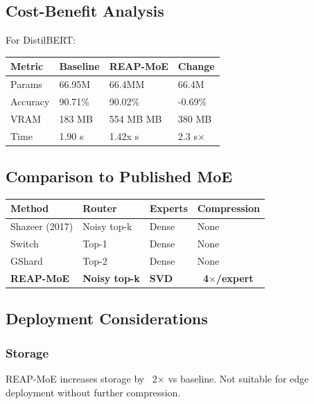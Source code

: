 \subsection{Cost-Benefit Analysis}

For DistilBERT:

\begin{table}[H]
\centering
\small
\begin{tabular}{llll}
\toprule
\textbf{Metric} & \textbf{Baseline} & \textbf{REAP-MoE} & \textbf{Change} \\
\midrule
Params & 66.95M & 66.4MM & 66.4M \\
Accuracy & 90.71\% & 90.02\% & -0.69\% \\
VRAM & 183 MB & 554 MB MB & 380 MB \\
Time & 1.90 s & 1.42x s & 2.3 s$\times$ \\
\bottomrule
\end{tabular}
\end{table}

\subsection{Comparison to Published MoE}

\begin{table}[H]
\centering
\small
\begin{tabular}{llll}
\toprule
\textbf{Method} & \textbf{Router} & \textbf{Experts} & \textbf{Compression} \\
\midrule
Shazeer (2017) & Noisy top-k & Dense & None \\
Switch & Top-1 & Dense & None \\
GShard & Top-2 & Dense & None \\
\textbf{REAP-MoE} & \textbf{Noisy top-k} & \textbf{SVD} & \textbf{~4$\times$/expert} \\
\bottomrule
\end{tabular}
\end{table}

\subsection{Deployment Considerations}

\subsubsection{Storage}
REAP-MoE increases storage by ~2$\times$ vs baseline. Not suitable for edge 
deployment without further compression.

